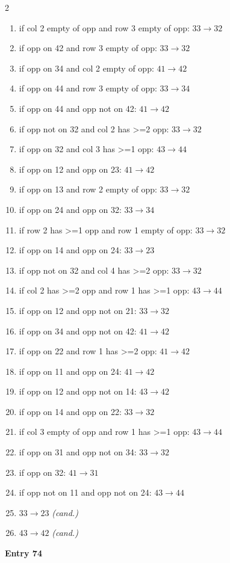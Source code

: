 \begin{multicols}{2}
\begin{tikzpicture}[scale=0.24]
\end{tikzpicture}
\nopagebreak\begin{enumerate}[topsep=1pt,itemsep=0pt,parsep=0pt,leftmargin=2.2em,label=\arabic*.]
\item if col 2 empty of opp and row 3 empty of opp: $33\!\to\!32$
\item if opp on 42 and row 3 empty of opp: $33\!\to\!32$
\item if opp on 34 and col 2 empty of opp: $41\!\to\!42$
\item if opp on 44 and row 3 empty of opp: $33\!\to\!34$
\item if opp on 44 and opp not on 42: $41\!\to\!42$
\item if opp not on 32 and col 2 has >=2 opp: $33\!\to\!32$
\item if opp on 32 and col 3 has >=1 opp: $43\!\to\!44$
\item if opp on 12 and opp on 23: $41\!\to\!42$
\item if opp on 13 and row 2 empty of opp: $33\!\to\!32$
\item if opp on 24 and opp on 32: $33\!\to\!34$
\item if row 2 has >=1 opp and row 1 empty of opp: $33\!\to\!32$
\item if opp on 14 and opp on 24: $33\!\to\!23$
\item if opp not on 32 and col 4 has >=2 opp: $33\!\to\!32$
\item if col 2 has >=2 opp and row 1 has >=1 opp: $43\!\to\!44$
\item if opp on 12 and opp not on 21: $33\!\to\!32$
\item if opp on 34 and opp not on 42: $41\!\to\!42$
\item if opp on 22 and row 1 has >=2 opp: $41\!\to\!42$
\item if opp on 11 and opp on 24: $41\!\to\!42$
\item if opp on 12 and opp not on 14: $43\!\to\!42$
\item if opp on 14 and opp on 22: $33\!\to\!32$
\item if col 3 empty of opp and row 1 has >=1 opp: $43\!\to\!44$
\item if opp on 31 and opp not on 34: $33\!\to\!32$
\item if opp on 32: $41\!\to\!31$
\item if opp not on 11 and opp not on 24: $43\!\to\!44$
\item $33\!\to\!23$ \hfill\textit{(cand.)}
\item $43\!\to\!42$ \hfill\textit{(cand.)}
\end{enumerate}\smallskip
\noindent\textbf{Entry 74} \; 
\end{multicols}
